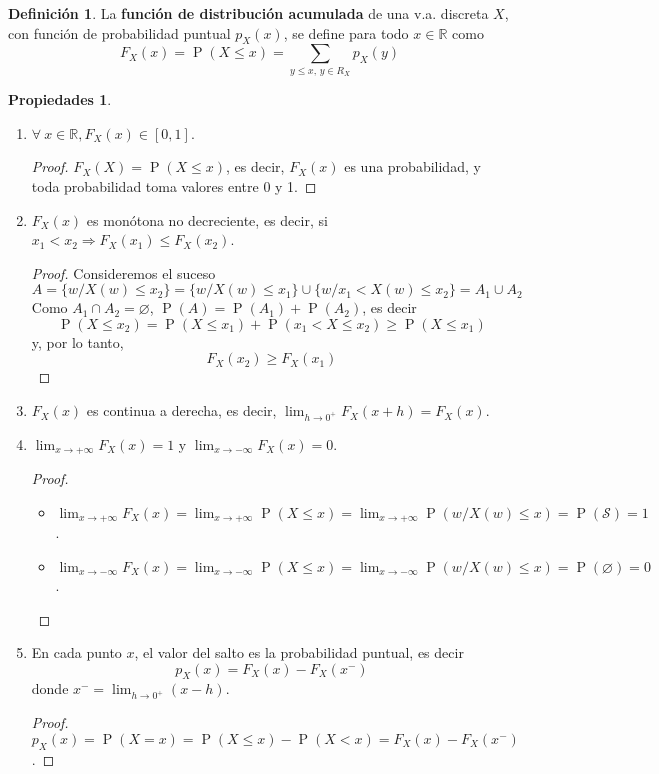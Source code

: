 \documentclass[11pt]{article}
\theoremstyle{plain}
\theoremstyle{definition}
\newtheorem*{defi}{Definición}
\newtheorem*{props}{Propiedades}
\theoremstyle{remark}
\newcommand{\deft}[1]{\textbf{#1}}  %
\newcommand{\proba}{\ensuremath{\operatorname{P}}}  %
\newcommand{\espm}[0]{\ensuremath{\mathcal{S}}}  %
\newcommand{\foralle}{\ensuremath{\forall \ }}  %
\begin{document}
    \begin{defi}
      La \deft{función de distribución acumulada} de una v.a. discreta $X$, con función de probabilidad puntual $p_X(x)$, se define para todo $x \in \mathbb{R}$ como
      \[ F_X(x) = \proba(X \leq x) = \sum_{y \leq x,\, y \in R_X} p_X(y) \]
    \end{defi}

    \begin{props} \
      \begin{enumerate}
        \item $\foralle x \in \mathbb{R}, F_X(x) \in [0,1]$.
        \begin{proof}
          $F_X(X) = \proba(X \leq x)$, es decir, $F_X(x)$ es una probabilidad, y toda probabilidad toma valores entre 0 y 1.
        \end{proof}

        \item $F_X(x)$ es monótona no decreciente, es decir, si $x_1 < x_2 \Rightarrow F_X(x_1) \leq F_X(x_2)$.
        \begin{proof}
          Consideremos el suceso
          \[ A = \lbrace w / X(w) \leq x_2 \rbrace = \lbrace w / X(w) \leq x_1 \rbrace \cup \lbrace w / x_1 < X(w) \leq x_2 \rbrace = A_1 \cup A_2 \]
          Como $A_1 \cap A_2 = \varnothing$, $\proba(A) = \proba(A_1) + \proba(A_2)$, es decir
          \[ \proba(X \leq x_2) = \proba(X \leq x_1) + \proba(x_1 < X \leq x_2) \geq \proba(X \leq x_1) \]
          y, por lo tanto,
          \[ F_X(x_2) \geq F_X(x_1) \]
        \end{proof}

        \item $F_X(x)$ es continua a derecha, es decir, $\lim_{h \to 0^+} F_X(x + h) = F_X(x)$.

        \item $\lim_{x \to +\infty} F_X(x) = 1$ y $\lim_{x \to -\infty} F_X(x) = 0$.
        \begin{proof} \
          \begin{itemize}
            \item $\lim_{x \to +\infty} F_X(x) = \lim_{x \to +\infty} \proba(X \leq x) = \lim_{x \to +\infty} \proba(w / X(w) \leq x) = \proba(\espm) = 1$.
            \item $\lim_{x \to -\infty} F_X(x) = \lim_{x \to -\infty} \proba(X \leq x) = \lim_{x \to -\infty} \proba(w / X(w) \leq x) = \proba(\varnothing) = 0$.
          \end{itemize}
        \end{proof}

        \item En cada punto $x$, el valor del salto es la probabilidad puntual, es decir
        \[ p_X(x) = F_X(x) - F_X(x^-) \]
        donde $x^- = \lim_{h \to 0^+} (x - h)$.
        \begin{proof}
          $p_X(x) = \proba(X = x) = \proba(X \leq x) - \proba(X < x) = F_X(x) - F_X(x^-)$.
        \end{proof}

      \end{enumerate}
    \end{props}
\end{document}
